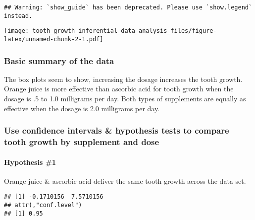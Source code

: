 \documentclass[
]{article}
\newenvironment{Shaded}{\begin{snugshade}}{\end{snugshade}}
\newcommand{\AttributeTok}[1]{\textcolor[rgb]{0.77,0.63,0.00}{#1}}
\newcommand{\FunctionTok}[1]{\textcolor[rgb]{0.00,0.00,0.00}{#1}}
\newcommand{\NormalTok}[1]{#1}
\newcommand{\OtherTok}[1]{\textcolor[rgb]{0.56,0.35,0.01}{#1}}
\newcommand{\SpecialCharTok}[1]{\textcolor[rgb]{0.00,0.00,0.00}{#1}}
\begin{document}
\begin{verbatim}
## Warning: `show_guide` has been deprecated. Please use `show.legend` instead.
\end{verbatim}

\texttt{[image: tooth\_growth\_inferential\_data\_analysis\_files/figure-latex/unnamed-chunk-2-1.pdf]}

\hypertarget{basic-summary-of-the-data}{%
\subsubsection{Basic summary of the
data}\label{basic-summary-of-the-data}}

The box plots seem to show, increasing the dosage increases the tooth
growth. Orange juice is more effective than ascorbic acid for tooth
growth when the dosage is .5 to 1.0 milligrams per day. Both types of
supplements are equally as effective when the dosage is 2.0 milligrams
per day.

\hypertarget{use-confidence-intervals-hypothesis-tests-to-compare-tooth-growth-by-supplement-and-dose}{%
\subsubsection{Use confidence intervals \& hypothesis tests to compare
tooth growth by supplement and
dose}\label{use-confidence-intervals-hypothesis-tests-to-compare-tooth-growth-by-supplement-and-dose}}

\hypertarget{hypothesis-1}{%
\paragraph{Hypothesis \#1}\label{hypothesis-1}}

Orange juice \& ascorbic acid deliver the same tooth growth across the
data set.

\begin{Shaded}
\end{Shaded}

\begin{verbatim}
## [1] -0.1710156  7.5710156
## attr(,"conf.level")
## [1] 0.95
\end{verbatim}
\end{document}
